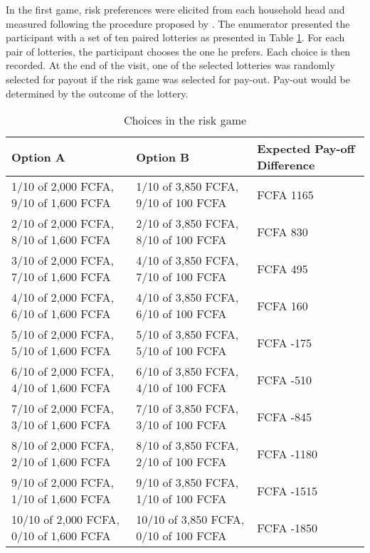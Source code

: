 In the first game, risk preferences were elicited from each household head and measured following the procedure proposed by \cite{Holt2002}. The enumerator presented the participant with a set of ten paired lotteries as presented in Table \ref{tab:risk_choices}. For each pair of lotteries, the participant chooses the one he prefers. Each choice is then recorded. At the end of the visit, one of the selected lotteries was randomly selected for payout if the risk game was selected for pay-out. Pay-out would be determined by the outcome of the lottery.

\begin{table}[htb]
	\centering
	\caption{Choices in the risk game}
	\footnotesize
	\label{tab:risk_choices}
	\begin{tabular}{l l l}

	\toprule
	Option A & Option B & Expected Pay-off Difference \\
	\hline
	1/10 of 2,000 FCFA, 9/10 of 1,600 FCFA	& 1/10 of 3,850 FCFA, 9/10 of 100 FCFA 	& FCFA 1165 \\
	2/10 of 2,000 FCFA, 8/10 of 1,600 FCFA	& 2/10 of 3,850 FCFA, 8/10 of 100 FCFA 	& FCFA 830 \\
	3/10 of 2,000 FCFA, 7/10 of 1,600 FCFA	& 4/10 of 3,850 FCFA, 7/10 of 100 FCFA 	& FCFA 495 \\
	4/10 of 2,000 FCFA, 6/10 of 1,600 FCFA	& 4/10 of 3,850 FCFA, 6/10 of 100 FCFA 	& FCFA 160 \\
	5/10 of 2,000 FCFA, 5/10 of 1,600 FCFA	& 5/10 of 3,850 FCFA, 5/10 of 100 FCFA 	& FCFA -175 \\
	6/10 of 2,000 FCFA, 4/10 of 1,600 FCFA	& 6/10 of 3,850 FCFA, 4/10 of 100 FCFA 	& FCFA -510 \\
	7/10 of 2,000 FCFA, 3/10 of 1,600 FCFA	& 7/10 of 3,850 FCFA, 3/10 of 100 FCFA 	& FCFA -845 \\
	8/10 of 2,000 FCFA, 2/10 of 1,600 FCFA	& 8/10 of 3,850 FCFA, 2/10 of 100 FCFA 	& FCFA -1180 \\
	9/10 of 2,000 FCFA, 1/10 of 1,600 FCFA	& 9/10 of 3,850 FCFA, 1/10 of 100 FCFA 	& FCFA -1515 \\
	10/10 of 2,000 FCFA, 0/10 of 1,600 FCFA	& 10/10 of 3,850 FCFA, 0/10 of 100 FCFA & FCFA -1850 \\
	\bottomrule
	\end{tabular}
\end{table}


